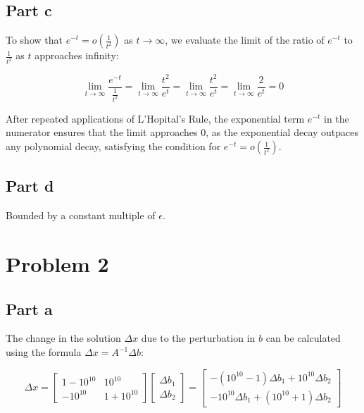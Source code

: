 \documentclass[12pt]{article}
\begin{document}
\subsection*{Part c}

To show that \(e^{-t} = o\left(\frac{1}{t^2}\right)\) as \(t \rightarrow \infty\), we evaluate the limit of the ratio of \(e^{-t}\) to \(\frac{1}{t^2}\) as \(t\) approaches infinity:

\[
\lim_{t \to \infty} \frac{e^{-t}}{\frac{1}{t^2}} =  \lim_{t \to \infty} \frac{t^2}{e^t} = \lim_{t \to \infty} \frac{t^2}{e^t} = \lim_{t \to \infty} \frac{2}{e^t} = 0
\]

After repeated applications of L'Hopital's Rule, the exponential term \(e^{-t}\) in the numerator ensures that the limit approaches 0, as the exponential decay outpaces any polynomial decay, satisfying the condition for \(e^{-t} = o\left(\frac{1}{t^2}\right)\).


\subsection*{Part d}



Bounded by a constant multiple of $\epsilon$.

\newpage

\section*{Problem 2}

\subsection*{Part a}

The change in the solution $\Delta x$ due to the perturbation in $b$ can be calculated using the formula $\Delta x = A^{-1} \Delta b$:

\[
\Delta x = 
\begin{bmatrix}
1 - 10^{10} & 10^{10} \\
-10^{10} & 1 + 10^{10}
\end{bmatrix}
\begin{bmatrix}
\Delta b_1 \\
\Delta b_2
\end{bmatrix}
=
\begin{bmatrix}
-(10^{10} - 1)\Delta b_1 + 10^{10}\Delta b_2 \\
-10^{10}\Delta b_1 + (10^{10} + 1)\Delta b_2
\end{bmatrix}
\]
\end{document}
